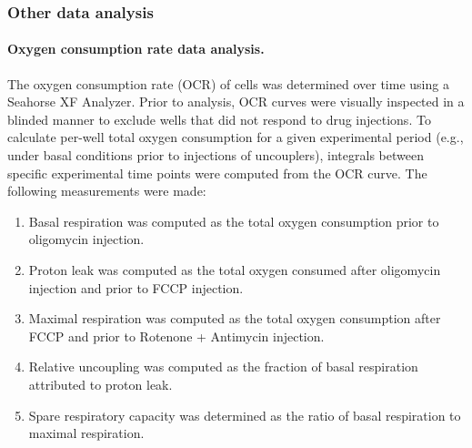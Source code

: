 \subsubsection{Other data analysis}

\paragraph{Oxygen consumption rate data analysis.}
The oxygen consumption rate (OCR) of cells was determined over time using a Seahorse XF Analyzer. Prior to analysis, OCR curves were visually inspected in a blinded manner to exclude wells that did not respond to drug injections. To calculate per-well total oxygen consumption for a given experimental period (e.g., under basal conditions prior to injections of uncouplers), integrals between specific experimental time points were computed from the OCR curve. The following measurements were made:
\begin{enumerate}
    \item Basal respiration was computed as the total oxygen consumption prior to oligomycin injection.
    \item Proton leak was computed as the total oxygen consumed after oligomycin injection and prior to FCCP injection.
    \item Maximal respiration was computed as the total oxygen consumption after FCCP and prior to Rotenone + Antimycin injection.
    \item Relative uncoupling was computed as the fraction of basal respiration attributed to proton leak.
    \item Spare respiratory capacity was determined as the ratio of basal respiration to maximal respiration.
\end{enumerate}